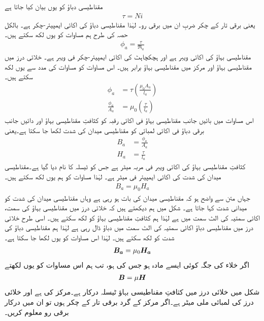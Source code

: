 مقناطیسی دباؤ کو یوں بیان کیا جاتا ہے
\begin{align}
\tau=N i
\end{align}
یعنی برقی تار کے چکر ضربِ ان میں برقی رو۔ لہٰذا مقناطیسی دباؤ کی اکائی ایمپیئر-چکر  ہے۔ بالکل حصہ  کی طرح ہم مساوات کو یوں لکھ سکتے ہیں۔
\begin{align}
\phi_a=\frac{\tau}{\Re_a}
\end{align}
مقناطیسی بہاؤ کی اکائی ویبر  ہے اور ہچکچاہٹ کی اکائی ایمپیئر-چکر فی ویبر ہے۔  خلائی درز میں مقناطیسی بہاؤ  اور مرکز میں مقناطیسی بہاؤ  برابر ہیں۔ اس مساوات کو مساوات   کی مدد سے یوں لکھ سکتے ہیں۔
\begin{align}
\phi_a &=\tau \left(\frac{\mu_0 A_a}{l_a} \right)\\
\frac{\phi_a}{A_a}&=\mu_0 \left( \frac{\tau}{l_a} \right)
\end{align}
	اس مساوات میں بائیں جانب مقناطیسی بہاؤ فی اکائی رقبہ کو کثافتِ مقناطیسی بہاؤ  اور دائیں جانب برقی دباؤ فی اکائی لمبائی کو مقناطیسی میدان کی شدت   لکھا جا سکتا ہے۔یعنی
\begin{align}
B_a&=\frac{\phi_a}{A_a}\\
H_a&=\frac{\tau}{l_a}
\end{align}
کثافتِ مقناطیسی بہاؤ کی اکائی ویبر فی مربہ میٹر ہے جس کو ٹیسلہ  کا نام دیا گیا ہے۔مقناطیسی میدان کی شدت کی اکائی ایمپیئر فی میٹر  ہے۔ لہٰذا مساوات کو ہم یوں لکھ سکتے ہیں۔
\begin{align}
B_a=\mu_0 H_a
\end{align}
جہاں متن سے واضح ہو کہ مقناطیسی میدان کی بات ہو رہی ہے وہاں مقناطیسی میدان کی شدت کو میدانی شدت کہا جاتا ہے۔  شکل میں ہم دیکھتے ہیں کہ خلائی درز میں مقناطیسی بہاؤ کی سمت،  اکائی سمتیہ  کی الٹ سمت میں ہے لہٰذا ہم کثافتِ مقناطیسی بہاؤ کو  لکھ سکتے ہیں۔ اسی طرح خلائی درز میں مقناطیسی دباؤ  اکائی سمتیہ  کی الٹ سمت میں دباؤ ڈال رہی ہے لہٰذا ہم مقناطیسی دباؤ کی شدت کو  لکھ سکتے ہیں۔ لہٰذا اس مساوات کو یوں لکھا جا سکتا ہے۔
\begin{align}
{\ensuremath{{\boldsymbol{B_a}}}}=\mu_0 {{\boldsymbol{H_a}}}
\end{align}
اگر خلاء کی جگہ کوئی ایسے مادہ ہو جس کی ہو، تب ہم اس مساوات کو یوں لکھتے
\begin{align}
{\ensuremath{{\boldsymbol{B}}}}=\mu {\ensuremath{{\boldsymbol{H}}}}
\end{align}
%
شکل میں خلائی درز میں کثافتِ مقناطیسی بہاؤ  ٹیسلہ درکار ہے۔مرکز کی   ہے اور خلائی درز کی لمبائی  ملی میٹر ہے۔اگر  مرکز کے گرد برقی تار کے  چکر ہوں تو ان میں درکار برقی رو معلوم کریں۔


